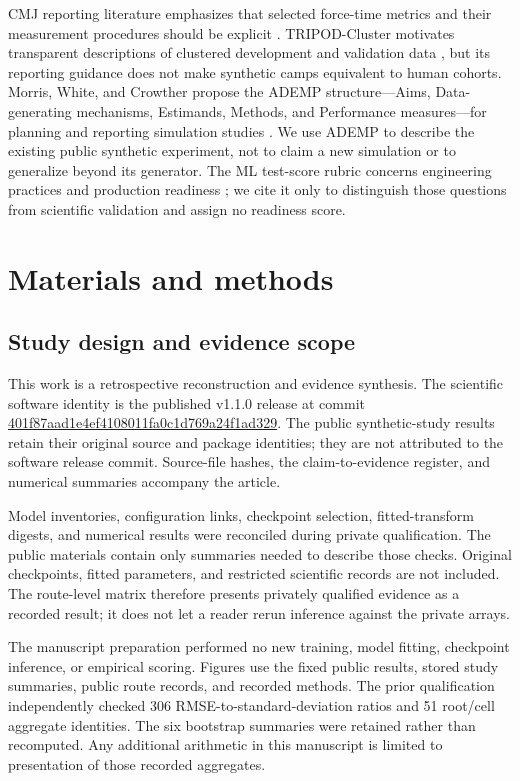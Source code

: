 \documentclass[12pt,a4paper]{article}
\begin{document}
CMJ reporting literature emphasizes that selected force-time metrics and their measurement procedures should be explicit \cite{R3,R4}. TRIPOD-Cluster motivates transparent descriptions of clustered development and validation data \cite{R5}, but its reporting guidance does not make synthetic camps equivalent to human cohorts. Morris, White, and Crowther propose the ADEMP structure—Aims, Data-generating mechanisms, Estimands, Methods, and Performance measures—for planning and reporting simulation studies \cite{R12}. We use ADEMP to describe the existing public synthetic experiment, not to claim a new simulation or to generalize beyond its generator. The ML test-score rubric concerns engineering practices and production readiness \cite{R14}; we cite it only to distinguish those questions from scientific validation and assign no readiness score.

\section{Materials and methods}

\subsection{Study design and evidence scope}

This work is a retrospective reconstruction and evidence synthesis. The scientific software identity is the published v1.1.0 release at commit \url{401f87aad1e4ef4108011fa0c1d769a24f1ad329}. The public synthetic-study results retain their original source and package identities; they are not attributed to the software release commit. Source-file hashes, the claim-to-evidence register, and numerical summaries accompany the article.

Model inventories, configuration links, checkpoint selection, fitted-transform digests, and numerical results were reconciled during private qualification. The public materials contain only summaries needed to describe those checks. Original checkpoints, fitted parameters, and restricted scientific records are not included. The route-level matrix therefore presents privately qualified evidence as a recorded result; it does not let a reader rerun inference against the private arrays.

The manuscript preparation performed no new training, model fitting, checkpoint inference, or empirical scoring. Figures use the fixed public results, stored study summaries, public route records, and recorded methods. The prior qualification independently checked 306 RMSE-to-standard-deviation ratios and 51 root/cell aggregate identities. The six bootstrap summaries were retained rather than recomputed. Any additional arithmetic in this manuscript is limited to presentation of those recorded aggregates.
\end{document}
